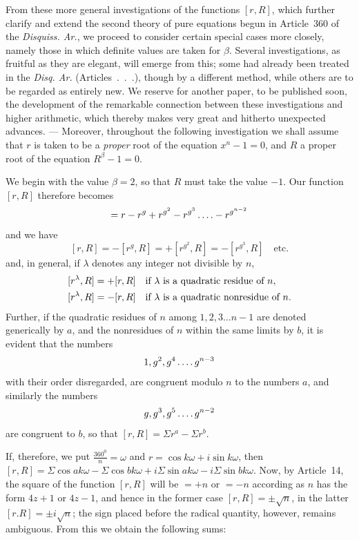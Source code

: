 From these more general investigations of the functions $[r,R]$, which further clarify and extend the second theory of pure equations begun in Article~360 of the \emph{Disquiss. Ar.}, we proceed to consider certain special cases more closely, namely those in which definite values are taken for $\beta$. Several investigations, as fruitful as they are elegant, will emerge from this; some had already been treated in the \emph{Disq. Ar.} (Articles\ .\ .\ .), though by a different method, while others are to be regarded as entirely new. We reserve for another paper, to be published soon, the development of the remarkable connection between these investigations and higher arithmetic, which thereby makes very great and hitherto unexpected advances. — Moreover, throughout the following investigation we shall assume that $r$ is taken to be a \emph{proper} root of the equation $x^n-1=0$, and $R$ a proper root of the equation $R^\beta-1=0$.

We begin with the value $\beta=2$, so that $R$ must take the value $-1$. Our function $[r,R]$ therefore becomes
\[
=r-r^g+r^{g^2}-r^{g^3}\mathinner{.\,.\,.\,.}-r^{g^{n-2}}
\]
and we have
\[
[r,R]=-[r^g,R]=+[r^{g^2},R]=-[r^{g^3},R]\quad\text{etc.}
\]
and, in general, if $\lambda$ denotes any integer not divisible by $n$,
\[
\begin{aligned}
\relax[r^\lambda,R]&=+[r,R]\quad\text{if }\lambda\text{ is a quadratic residue of }n,\\
\relax[r^\lambda,R]&=-[r,R]\quad\text{if }\lambda\text{ is a quadratic nonresidue of }n.
\end{aligned}
\]
Further, if the quadratic residues of $n$ among $1,2,3\dots n-1$ are denoted generically by $a$, and the nonresidues of $n$ within the same limits by $b$, it is evident that the numbers
\[
1,g^2,g^4\mathinner{.\,.\,.\,.} g^{n-3}
\]
with their order disregarded, are congruent modulo $n$ to the numbers $a$, and similarly the numbers
\[
g,g^3,g^5\mathinner{.\,.\,.\,.} g^{n-2}
\]
are congruent to $b$, so that $[r,R]=\Sigma r^a-\Sigma r^b$.

If, therefore, we put $\frac{360^0}n=\omega$ and $r=\cos k\omega+i\sin k\omega$, then $[r,R]=\Sigma\cos ak\omega-\Sigma\cos bk\omega+i\Sigma\sin ak\omega-i\Sigma\sin bk\omega$. Now, by Article~14, the square of the function $[r,R]$ will be $=+n$ or $=-n$ according as $n$ has the form $4z+1$ or $4z-1$, and hence in the former case $[r,R]=\pm\surd n$, in the latter $[r.R]=\pm i\surd n$; the sign placed before the radical quantity, however, remains ambiguous. From this we obtain the following sums:

